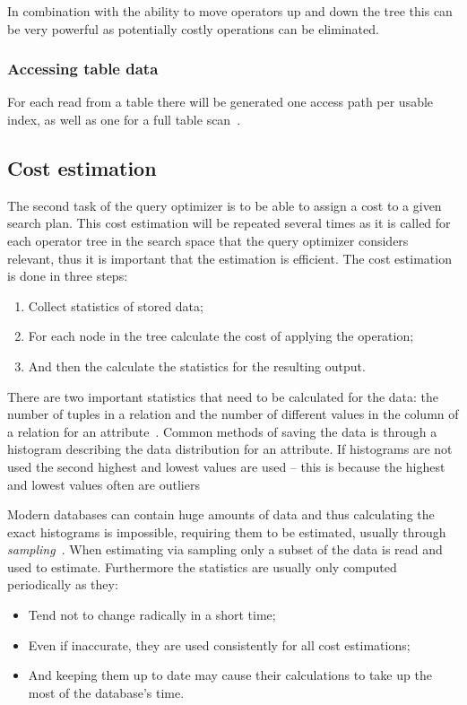 In combination with the ability to move operators up and down the tree this can be very powerful as potentially costly operations can be eliminated.

\subsubsection{Accessing table data}
For each read from a table there will be generated one access path per usable index, as well as one for a full table scan~\cite[p. 827-829]{garcia-molina_2002_database_dstcb}.

\subsection{Cost estimation}
The second task of the query optimizer is to be able to assign a cost to a given search plan. This cost estimation will be repeated several times as it is called for each operator tree in the search space that the query optimizer considers relevant, thus it is important that the estimation is efficient. The cost estimation is done in three steps:
\begin{enumerate}
    \item Collect statistics of stored data;
    \item For each node in the tree calculate the cost of applying the operation;
    \item And then the calculate the statistics for the resulting output.
\end{enumerate}

There are two important statistics that need to be calculated for the data: the number of tuples in a relation and the number of different values in the column of a relation for an attribute~\cite[p. 807-808]{garcia-molina_2002_database_dstcb}. Common methods of saving the data is through a histogram describing the data distribution for an attribute. If histograms are not used the second highest and lowest values are used – this is because the highest and lowest values often are outliers

Modern databases can contain huge amounts of data and thus calculating the exact histograms is impossible, requiring them to be estimated, usually through \textit{sampling}~\cite[p. 807-808]{garcia-molina_2002_database_dstcb}. When estimating via sampling only a subset of the data is read and used to estimate. Furthermore the statistics are usually only computed periodically as they:
\begin{itemize}
    \item Tend not to change radically in a short time;
    \item Even if inaccurate, they are used consistently for all cost estimations;
    \item And keeping them up to date may cause their calculations to take up the most of the database's time.
\end{itemize}

